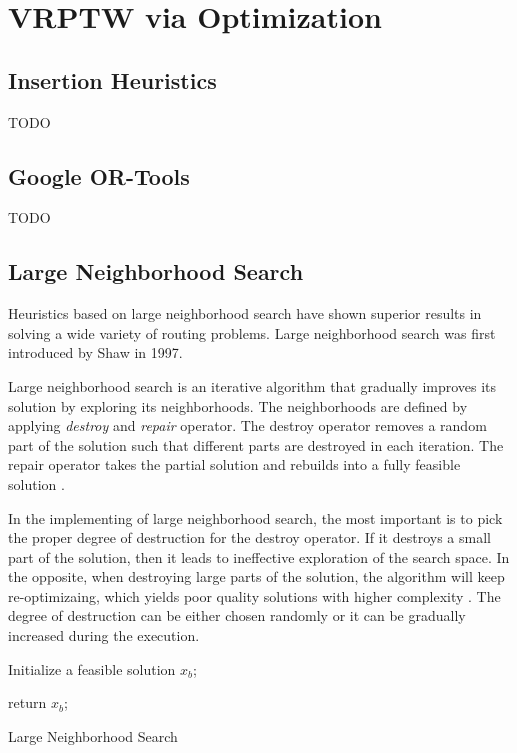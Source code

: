 \chapter{VRPTW via Optimization}


\section{Insertion Heuristics}
TODO
        
\section{Google OR-Tools}
TODO
    
\section{Large Neighborhood Search}
Heuristics based on large neighborhood search have shown superior results in solving a wide variety of routing problems. Large neighborhood search was first introduced by Shaw \cite{shaw-lns} in 1997.

Large neighborhood search is an iterative algorithm that gradually improves its solution by exploring its neighborhoods. The neighborhoods are defined by applying \emph{destroy} and \emph{repair} operator. The destroy operator removes a random part of the solution such that different parts are destroyed in each iteration. The repair operator takes the partial solution and rebuilds into a fully feasible solution \cite{lns}.\newline

In the implementing of large neighborhood search, the most important is to pick the proper degree of destruction for the destroy operator. If it destroys a small part of the solution, then it leads to ineffective exploration of the search space. In the opposite, when destroying large parts of the solution, the algorithm will keep re-optimizaing, which yields poor quality solutions with higher complexity \cite{lns}. The degree of destruction can be either chosen randomly or it can be gradually increased during the execution.\newline

\begin{algorithm}[H]
    \SetAlgoLined
    Initialize a feasible solution $x_b$;
    
        return $x_b$;
    \caption{Large Neighborhood Search}
\end{algorithm}


